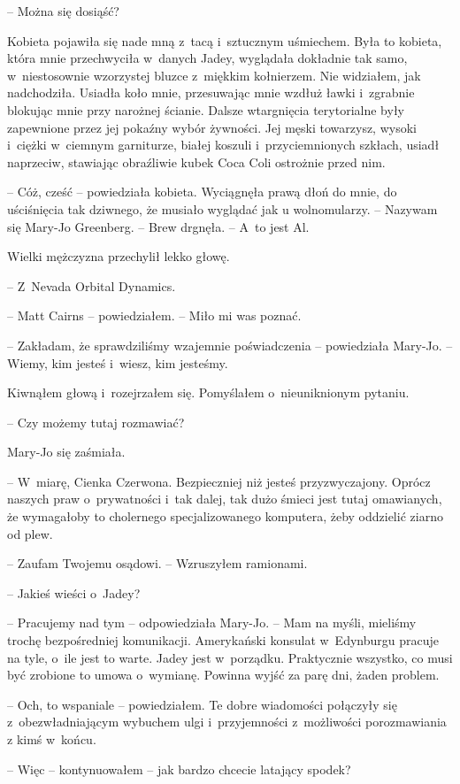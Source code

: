 \documentclass[oneside,polish,12pt,sfheadings]{mwbk}
\begin{document}
-- Można się dosiąść?

Kobieta pojawiła się nade mną z~tacą i~sztucznym uśmiechem. Była to
kobieta, która mnie przechwyciła w~danych Jadey, wyglądała dokładnie tak
samo, w~niestosownie wzorzystej bluzce z~miękkim kołnierzem. Nie
widziałem, jak nadchodziła. Usiadła koło mnie, przesuwając mnie wzdłuż
ławki i~zgrabnie blokując mnie przy narożnej ścianie. Dalsze wtargnięcia
terytorialne były zapewnione przez jej pokaźny wybór żywności. Jej męski
towarzysz, wysoki i~ciężki w~ciemnym garniturze, białej koszuli i~przyciemnionych szkłach, usiadł naprzeciw, stawiając obraźliwie kubek
Coca Coli ostrożnie przed nim.

-- Cóż, cześć -- powiedziała kobieta. Wyciągnęła prawą dłoń do mnie, do
uściśnięcia tak dziwnego, że musiało wyglądać jak u wolnomularzy. --
Nazywam się Mary-Jo Greenberg. -- Brew drgnęła. -- A~to jest Al.

Wielki mężczyzna przechylił lekko głowę. 

-- Z~Nevada Orbital Dynamics.

-- Matt Cairns -- powiedziałem. -- Miło mi was poznać.

-- Zakładam, że sprawdziliśmy wzajemnie poświadczenia -- powiedziała
Mary-Jo. -- Wiemy, kim jesteś i~wiesz, kim jesteśmy.

Kiwnąłem głową i~rozejrzałem się. Pomyślałem o~nieuniknionym pytaniu. 

-- Czy możemy tutaj rozmawiać?

Mary-Jo się zaśmiała. 

-- W~miarę, Cienka Czerwona. Bezpieczniej niż
jesteś przyzwyczajony. Oprócz naszych praw o~prywatności i~tak dalej,
tak dużo śmieci jest tutaj omawianych, że wymagałoby to cholernego
specjalizowanego komputera, żeby oddzielić ziarno od plew.

-- Zaufam Twojemu osądowi. -- Wzruszyłem ramionami.

-- Jakieś wieści o~Jadey?

-- Pracujemy nad tym -- odpowiedziała Mary-Jo. -- Mam na myśli, mieliśmy
trochę bezpośredniej komunikacji. Amerykański konsulat w~Edynburgu
pracuje na tyle, o~ile jest to warte. Jadey jest w~porządku. Praktycznie
wszystko, co musi być zrobione to umowa o~wymianę. Powinna wyjść za parę
dni, żaden problem.

-- Och, to wspaniale -- powiedziałem. Te dobre wiadomości połączyły się z~obezwładniającym wybuchem ulgi i~przyjemności z~możliwości porozmawiania
z kimś w~końcu.

-- Więc -- kontynuowałem -- jak bardzo chcecie latający spodek?
\end{document}

